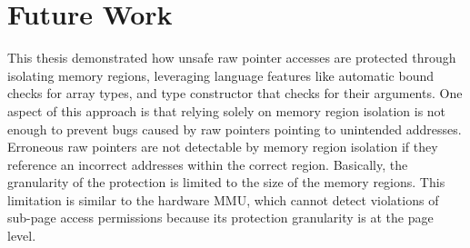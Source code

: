\section{Future Work}
\label{sec:fw}


This thesis demonstrated how unsafe raw pointer accesses are protected through
isolating memory regions,
leveraging language features like automatic bound checks for array types, and
type constructor that checks for their arguments.
One aspect of this approach is that
relying solely on memory region isolation is not enough to prevent bugs caused
by raw pointers pointing to unintended addresses.
Erroneous raw pointers are not detectable by memory region isolation if they
reference an incorrect addresses within the correct region.
Basically, the granularity of the protection is limited to the size of the
memory regions. This limitation is similar to the hardware MMU, which cannot
detect violations of sub-page access permissions because its protection
granularity is at the page level.

